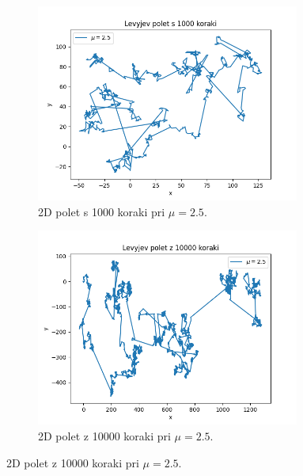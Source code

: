 \documentclass[a4paper, 12pt, slovene]{article}
\begin{document}
\begin{figure}[H]
\ContinuedFloat
\begin{subfigure}{0.49\textwidth}
	\centering
	\includegraphics[width=0.95\textwidth]{sprehodi/let-1000-2.5.png}
	\caption{2D polet s 1000 koraki pri $\mu = 2.5$.}
	\label{fig-let-1000-2.5}
\end{subfigure}
\begin{subfigure}{0.49\textwidth}
	\centering
	\includegraphics[width=0.95\textwidth]{sprehodi/let-10000-2.5.png}
	\caption{2D polet z 10000 koraki pri $\mu = 2.5$.}
	\label{fig-let-10000-2.5}
\end{subfigure}


\end{figure}
\end{document}
